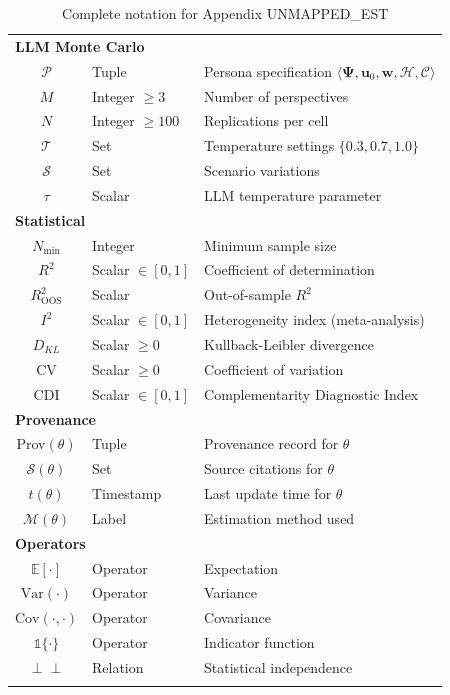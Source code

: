 \documentclass[11pt,a4paper]{article}
\theoremstyle{definition}
\begin{document}
\begin{longtable}{clp{8cm}}
\multicolumn{3}{l}{\textbf{LLM Monte Carlo}} \\
$\mathcal{P}$ & Tuple & Persona specification $\langle \boldsymbol{\Psi}, \mathbf{u}_0, \mathbf{w}, \mathcal{H}, \mathcal{C} \rangle$ \\
$M$ & Integer $\geq 3$ & Number of perspectives \\
$N$ & Integer $\geq 100$ & Replications per cell \\
$\mathcal{T}$ & Set & Temperature settings $\{0.3, 0.7, 1.0\}$ \\
$\mathcal{S}$ & Set & Scenario variations \\
$\tau$ & Scalar & LLM temperature parameter \\
\midrule

\multicolumn{3}{l}{\textbf{Statistical}} \\
$N_{\min}$ & Integer & Minimum sample size \\
$R^2$ & Scalar $\in [0,1]$ & Coefficient of determination \\
$R^2_{\text{OOS}}$ & Scalar & Out-of-sample $R^2$ \\
$I^2$ & Scalar $\in [0,1]$ & Heterogeneity index (meta-analysis) \\
$D_{KL}$ & Scalar $\geq 0$ & Kullback-Leibler divergence \\
CV & Scalar $\geq 0$ & Coefficient of variation \\
CDI & Scalar $\in [0,1]$ & Complementarity Diagnostic Index \\
\midrule

\multicolumn{3}{l}{\textbf{Provenance}} \\
Prov$(\theta)$ & Tuple & Provenance record for $\theta$ \\
$\mathcal{S}(\theta)$ & Set & Source citations for $\theta$ \\
$t(\theta)$ & Timestamp & Last update time for $\theta$ \\
$\mathcal{M}(\theta)$ & Label & Estimation method used \\
\midrule

\multicolumn{3}{l}{\textbf{Operators}} \\
$\mathbb{E}[\cdot]$ & Operator & Expectation \\
$\text{Var}(\cdot)$ & Operator & Variance \\
$\text{Cov}(\cdot, \cdot)$ & Operator & Covariance \\
$\mathbb{1}\{\cdot\}$ & Operator & Indicator function \\
$\perp\!\!\!\perp$ & Relation & Statistical independence \\
\bottomrule
\caption{Complete notation for Appendix UNMAPPED_EST}
\label{tab:bbb-notation}
\end{longtable}
\end{document}
